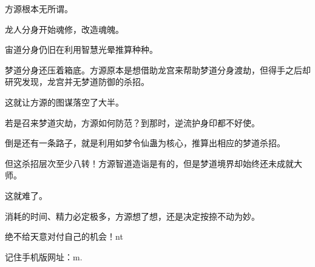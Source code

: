 \begin{this_body}
方源根本无所谓。

龙人分身开始魂修，改造魂魄。

宙道分身仍旧在利用智慧光晕推算种种。

梦道分身还压着箱底。方源原本是想借助龙宫来帮助梦道分身渡劫，但得手之后却研究发现，龙宫并无梦道防御的杀招。

这就让方源的图谋落空了大半。

若是召来梦道灾劫，方源如何防范？到那时，逆流护身印都不好使。

倒是还有一条路子，就是利用如梦令仙蛊为核心，推算出相应的梦道杀招。

但这杀招层次至少八转！方源智道造诣是有的，但是梦道境界却始终还未成就大师。

这就难了。

消耗的时间、精力必定极多，方源想了想，还是决定按捺不动为妙。

绝不给天意对付自己的机会！nt

记住手机版网址：m.

\end{this_body}

